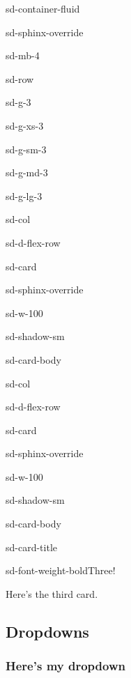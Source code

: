 \documentclass[letterpaper,10pt,english]{jupyterBook}
\begin{document}
\begin{sphinxuseclass}{sd-container-fluid}
\begin{sphinxuseclass}{sd-sphinx-override}
\begin{sphinxuseclass}{sd-mb-4}
\begin{sphinxuseclass}{sd-row}
\begin{sphinxuseclass}{sd-g-3}
\begin{sphinxuseclass}{sd-g-xs-3}
\begin{sphinxuseclass}{sd-g-sm-3}
\begin{sphinxuseclass}{sd-g-md-3}
\begin{sphinxuseclass}{sd-g-lg-3}
\begin{sphinxuseclass}{sd-col}
\begin{sphinxuseclass}{sd-d-flex-row}
\begin{sphinxuseclass}{sd-card}
\begin{sphinxuseclass}{sd-sphinx-override}
\begin{sphinxuseclass}{sd-w-100}
\begin{sphinxuseclass}{sd-shadow-sm}
\begin{sphinxuseclass}{sd-card-body}
\end{sphinxuseclass}
\end{sphinxuseclass}
\end{sphinxuseclass}
\end{sphinxuseclass}
\end{sphinxuseclass}
\end{sphinxuseclass}
\end{sphinxuseclass}
\begin{sphinxuseclass}{sd-col}
\begin{sphinxuseclass}{sd-d-flex-row}
\begin{sphinxuseclass}{sd-card}
\begin{sphinxuseclass}{sd-sphinx-override}
\begin{sphinxuseclass}{sd-w-100}
\begin{sphinxuseclass}{sd-shadow-sm}
\begin{sphinxuseclass}{sd-card-body}
\begin{sphinxuseclass}{sd-card-title}
\begin{sphinxuseclass}{sd-font-weight-bold}Three!
\end{sphinxuseclass}
\end{sphinxuseclass}
\sphinxAtStartPar
Here’s the third card.

\end{sphinxuseclass}
\end{sphinxuseclass}
\end{sphinxuseclass}
\end{sphinxuseclass}
\end{sphinxuseclass}
\end{sphinxuseclass}
\end{sphinxuseclass}
\end{sphinxuseclass}
\end{sphinxuseclass}
\end{sphinxuseclass}
\end{sphinxuseclass}
\end{sphinxuseclass}
\end{sphinxuseclass}
\end{sphinxuseclass}
\end{sphinxuseclass}
\end{sphinxuseclass}

\subsection{Dropdowns}
\label{\detokenize{docs/02_04_Mas_cosas:dropdowns}}\subsubsection*{Here’s my dropdown}
\end{document}
